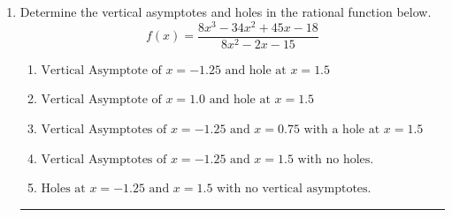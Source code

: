 \documentclass[14pt]{extbook}
\newcommand{\litem}[1]{\item#1\hspace*{-1cm}\rule{\textwidth}{0.4pt}}
\begin{document}
\begin{enumerate}
{\begin{enumerate}[label=\Alph*.]
\end{enumerate} }
\litem{
Determine the vertical asymptotes and holes in the rational function below.\[ f(x) = \frac{8x^{3} -34 x^{2} +45 x -18}{8x^{2} -2 x -15} \]\begin{enumerate}[label=\Alph*.]
\item \( \text{Vertical Asymptote of } x = -1.25 \text{ and hole at } x = 1.5 \)
\item \( \text{Vertical Asymptote of } x = 1.0 \text{ and hole at } x = 1.5 \)
\item \( \text{Vertical Asymptotes of } x = -1.25 \text{ and } x = 0.75 \text{ with a hole at } x = 1.5 \)
\item \( \text{Vertical Asymptotes of } x = -1.25 \text{ and } x = 1.5 \text{ with no holes.} \)
\item \( \text{Holes at } x = -1.25 \text{ and } x = 1.5 \text{ with no vertical asymptotes.} \)

\end{enumerate} }
\end{enumerate}
\end{document}
